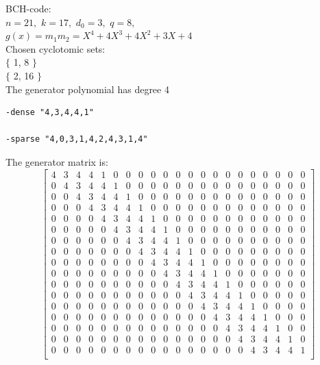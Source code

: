 \noindent
BCH-code:\\
$n=21,$ $k=17,$ $d_0=3,$ $q=8,$ \\
$g(x) = m_{1}m_{2}=
X^{4} + 4X^{3} + 4X^{2} + 3X + 4$
\\
\noindent
Chosen cyclotomic sets:\\
\noindent $\{$ 1, 8 $\}$\\
$\{$ 2, 16 $\}$\\
\bigskip
The generator polynomial has degree 4
\begin{verbatim}
-dense "4,3,4,4,1"

-sparse "4,0,3,1,4,2,4,3,1,4"

\end{verbatim}
The generator matrix is:
$$
\left[
\begin{array}{*{21}{c}}
4 & 3 & 4 & 4 & 1 & 0 & 0 & 0 & 0 & 0 & 0 & 0 & 0 & 0 & 0 & 0 & 0 & 0 & 0 & 0 & 0\\
0 & 4 & 3 & 4 & 4 & 1 & 0 & 0 & 0 & 0 & 0 & 0 & 0 & 0 & 0 & 0 & 0 & 0 & 0 & 0 & 0\\
0 & 0 & 4 & 3 & 4 & 4 & 1 & 0 & 0 & 0 & 0 & 0 & 0 & 0 & 0 & 0 & 0 & 0 & 0 & 0 & 0\\
0 & 0 & 0 & 4 & 3 & 4 & 4 & 1 & 0 & 0 & 0 & 0 & 0 & 0 & 0 & 0 & 0 & 0 & 0 & 0 & 0\\
0 & 0 & 0 & 0 & 4 & 3 & 4 & 4 & 1 & 0 & 0 & 0 & 0 & 0 & 0 & 0 & 0 & 0 & 0 & 0 & 0\\
0 & 0 & 0 & 0 & 0 & 4 & 3 & 4 & 4 & 1 & 0 & 0 & 0 & 0 & 0 & 0 & 0 & 0 & 0 & 0 & 0\\
0 & 0 & 0 & 0 & 0 & 0 & 4 & 3 & 4 & 4 & 1 & 0 & 0 & 0 & 0 & 0 & 0 & 0 & 0 & 0 & 0\\
0 & 0 & 0 & 0 & 0 & 0 & 0 & 4 & 3 & 4 & 4 & 1 & 0 & 0 & 0 & 0 & 0 & 0 & 0 & 0 & 0\\
0 & 0 & 0 & 0 & 0 & 0 & 0 & 0 & 4 & 3 & 4 & 4 & 1 & 0 & 0 & 0 & 0 & 0 & 0 & 0 & 0\\
0 & 0 & 0 & 0 & 0 & 0 & 0 & 0 & 0 & 4 & 3 & 4 & 4 & 1 & 0 & 0 & 0 & 0 & 0 & 0 & 0\\
0 & 0 & 0 & 0 & 0 & 0 & 0 & 0 & 0 & 0 & 4 & 3 & 4 & 4 & 1 & 0 & 0 & 0 & 0 & 0 & 0\\
0 & 0 & 0 & 0 & 0 & 0 & 0 & 0 & 0 & 0 & 0 & 4 & 3 & 4 & 4 & 1 & 0 & 0 & 0 & 0 & 0\\
0 & 0 & 0 & 0 & 0 & 0 & 0 & 0 & 0 & 0 & 0 & 0 & 4 & 3 & 4 & 4 & 1 & 0 & 0 & 0 & 0\\
0 & 0 & 0 & 0 & 0 & 0 & 0 & 0 & 0 & 0 & 0 & 0 & 0 & 4 & 3 & 4 & 4 & 1 & 0 & 0 & 0\\
0 & 0 & 0 & 0 & 0 & 0 & 0 & 0 & 0 & 0 & 0 & 0 & 0 & 0 & 4 & 3 & 4 & 4 & 1 & 0 & 0\\
0 & 0 & 0 & 0 & 0 & 0 & 0 & 0 & 0 & 0 & 0 & 0 & 0 & 0 & 0 & 4 & 3 & 4 & 4 & 1 & 0\\
0 & 0 & 0 & 0 & 0 & 0 & 0 & 0 & 0 & 0 & 0 & 0 & 0 & 0 & 0 & 0 & 4 & 3 & 4 & 4 & 1\\
\end{array}
\right]
$$
